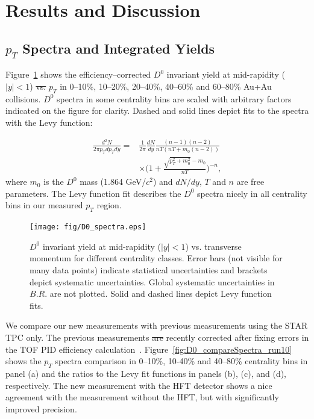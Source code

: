 \documentclass[%
 reprint,	
showpacs,
 amsmath,amssymb,
 aps,
 prc,
]{revtex4-1}
\providecommand{\DIFaddtex}[1]{{\protect\color{blue}\uwave{#1}}} %
\providecommand{\DIFdeltex}[1]{{\protect\color{red}\sout{#1}}}                      %
\providecommand{\DIFaddbegin}{} %
\providecommand{\DIFaddend}{} %
\providecommand{\DIFdelbegin}{} %
\providecommand{\DIFdelend}{} %
\providecommand{\DIFadd}[1]{\texorpdfstring{\DIFaddtex{#1}}{#1}} %
\providecommand{\DIFdel}[1]{\texorpdfstring{\DIFdeltex{#1}}{}} %
\begin{document}

\section{Results and Discussion}
\label{result}

\subsection{$p_{T}$ Spectra and Integrated Yields}
\label{result:pt}

Figure~\ref{fig:D0_spectra} shows the efficiency--corrected $D^0$ invariant yield at mid-rapidity ($|y|<1$) \DIFdelbegin \DIFdel{vs. }\DIFdelend \DIFaddbegin \DIFadd{as a function of }\DIFaddend $p_{T}$ in 0--10\%, 10--20\%, 20--40\%, 40--60\% and 60--80\% Au+Au collisions. $D^0$ spectra in some centrality bins are scaled with arbitrary factors indicated on the figure for clarity. Dashed and solid lines depict fits to the spectra with the Levy function:

\begin{equation}
  \begin{aligned}
    \frac{d^2N}{2\pi p_{T}dp_{T}dy} = 
   & \frac{1}{2\pi}\frac{dN}{dy}\frac{(n-1)(n-2)}{nT(nT+m_0(n-2))} \\
  & \times \bigg(1+\frac{\sqrt{p_{T}^2+m_0^2}-m_0}{nT}\bigg)^{-n},
  \end{aligned}
\label{equ:equation4}
\end{equation}
where $m_0$ is the $D^0$ mass (1.864 GeV/$c^2$) and $dN/dy$, $T$ and $n$ are free parameters. The Levy function fit describes the $D^0$ spectra nicely in all centrality bins in our measured $p_T$ region.


\begin{figure}
\centering
\texttt{[image: fig/D0\_spectra.eps]}
\caption{$D^{0}$ invariant yield at mid-rapidity ($|y|<1$) vs. transverse momentum for different centrality classes. Error bars (not visible for many data points) indicate statistical uncertainties and brackets depict systematic uncertainties. Global systematic uncertainties in $B.R.$ are not plotted. Solid and dashed lines depict Levy function fits.}
\label{fig:D0_spectra} 
\end{figure}


We compare our new measurements with previous measurements using the STAR TPC only. The previous measurements \DIFdelbegin \DIFdel{are }\DIFdelend \DIFaddbegin \DIFadd{have been }\DIFaddend recently corrected after fixing errors in the TOF PID efficiency calculation~\cite{Star_D_RAA}. Figure~\ref{fig:D0_compareSpectra_run10} shows the $p_{T}$ spectra comparison in 0--10\%, 10-40\% and 40--80\% centrality bins in panel (a) and the ratios to the Levy fit functions in panels (b), (c), and (d), respectively. The new measurement with the HFT detector shows a nice agreement with the measurement without the HFT, but with significantly improved precision.
\end{document}
